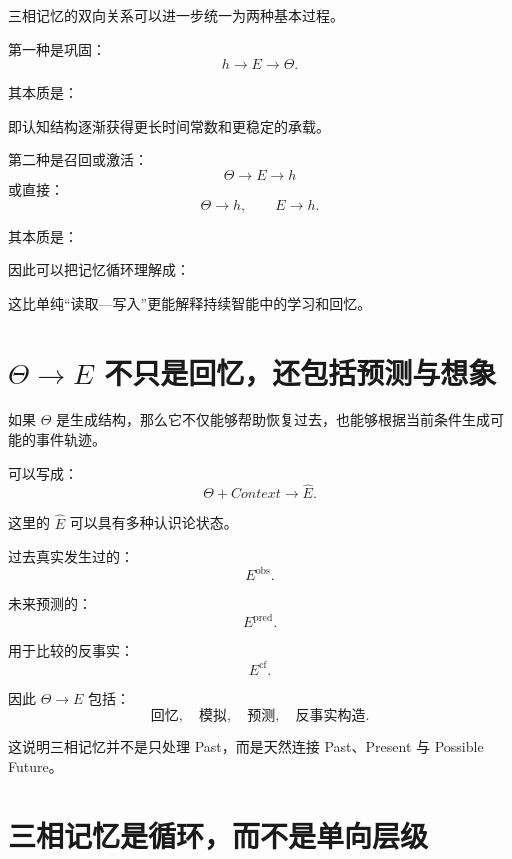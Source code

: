 三相记忆的双向关系可以进一步统一为两种基本过程。

第一种是巩固：
\[
h\rightarrow E\rightarrow\Theta.
\]

其本质是：
\begin{statementbox}
\centering
{}
\end{statementbox}

即认知结构逐渐获得更长时间常数和更稳定的承载。

第二种是召回或激活：
\[
\Theta\rightarrow E\rightarrow h
\]
或直接：
\[
\Theta\rightarrow h,
\qquad
E\rightarrow h.
\]

其本质是：
\begin{statementbox}
\centering
{}
\end{statementbox}

因此可以把记忆循环理解成：
\begin{statementbox}
\centering
{}
\end{statementbox}

这比单纯“读取—写入”更能解释持续智能中的学习和回忆。

\section{$\Theta\rightarrow E$ 不只是回忆，还包括预测与想象}

如果 $\Theta$ 是生成结构，那么它不仅能够帮助恢复过去，也能够根据当前条件生成可能的事件轨迹。

可以写成：
\[
\boxed{
\Theta
+
Context
\rightarrow
\hat E.
}
\]

这里的 $\hat E$ 可以具有多种认识论状态。

过去真实发生过的：
\[
E^{\mathrm{obs}}.
\]

未来预测的：
\[
E^{\mathrm{pred}}.
\]

用于比较的反事实：
\[
E^{\mathrm{cf}}.
\]

因此 $\Theta\rightarrow E$ 包括：
\[
\text{回忆},
\quad
\text{模拟},
\quad
\text{预测},
\quad
\text{反事实构造}.
\]

这说明三相记忆并不是只处理 Past，而是天然连接 Past、Present 与 Possible Future。

\section{三相记忆是循环，而不是单向层级}

